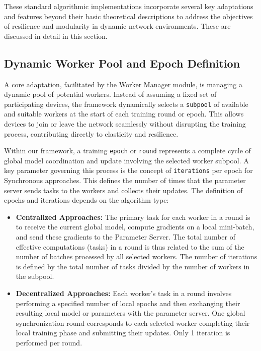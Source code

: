 These standard algorithmic implementations incorporate several key adaptations and features beyond their basic theoretical descriptions to address the objectives of resilience and modularity in dynamic network environments. These are discussed in detail in this section.

\subsection{Dynamic Worker Pool and Epoch Definition}
\label{sec:dynamic-worker-pool}

A core adaptation, facilitated by the Worker Manager module, is managing a dynamic pool of potential workers. Instead of assuming a fixed set of participating devices, the framework dynamically selects a \texttt{subpool} of available and suitable workers at the start of each training round or epoch. This allows devices to join or leave the network seamlessly without disrupting the training process, contributing directly to elasticity and resilience.

Within our framework, a training \texttt{epoch} or \texttt{round} represents a complete cycle of global model coordination and update involving the selected worker subpool. A key parameter governing this process is the concept of \texttt{iterations} per epoch for Synchronous approaches. This defines the number of times that the parameter server sends tasks to the workers and collects their updates. The definition of epochs and iterations depends on the algorithm type:

\begin{itemize}
    \item \textbf{Centralized Approaches:} The primary task for each worker in a round is to receive the current global model, compute gradients on a local mini-batch, and send these gradients to the Parameter Server. The total number of effective computations (tasks) in a round is thus related to the sum of the number of batches processed by all selected workers. The number of iterations is defined by the total number of tasks divided by the number of workers in the subpool. 
    \item \textbf{Decentralized Approaches:} Each worker's task in a round involves performing a specified number of local epochs and then exchanging their resulting local model or parameters with the parameter server. One global synchronization round corresponds to each selected worker completing their local training phase and submitting their updates. Only 1 iteration is performed per round.
\end{itemize}

